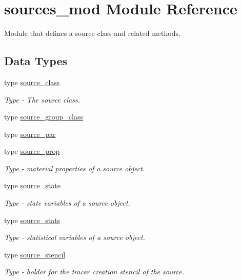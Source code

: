 \hypertarget{namespacesources__mod}{}\section{sources\+\_\+mod Module Reference}
\label{namespacesources__mod}


Module that defines a source class and related methods.  


\subsection*{Data Types}
\begin{DoxyCompactItemize}
\item 
type \mbox{\hyperlink{structsources__mod_1_1source__class}{source\+\_\+class}}
\begin{DoxyCompactList}\small\item\em Type -\/ The source class. \end{DoxyCompactList}\item 
type \mbox{\hyperlink{structsources__mod_1_1source__group__class}{source\+\_\+group\+\_\+class}}
\item 
type \mbox{\hyperlink{structsources__mod_1_1source__par}{source\+\_\+par}}
\item 
type \mbox{\hyperlink{structsources__mod_1_1source__prop}{source\+\_\+prop}}
\begin{DoxyCompactList}\small\item\em Type -\/ material properties of a source object. \end{DoxyCompactList}\item 
type \mbox{\hyperlink{structsources__mod_1_1source__state}{source\+\_\+state}}
\begin{DoxyCompactList}\small\item\em Type -\/ state variables of a source object. \end{DoxyCompactList}\item 
type \mbox{\hyperlink{structsources__mod_1_1source__stats}{source\+\_\+stats}}
\begin{DoxyCompactList}\small\item\em Type -\/ statistical variables of a source object. \end{DoxyCompactList}\item 
type \mbox{\hyperlink{structsources__mod_1_1source__stencil}{source\+\_\+stencil}}
\begin{DoxyCompactList}\small\item\em Type -\/ holder for the tracer creation stencil of the source. \end{DoxyCompactList}\end{DoxyCompactItemize}

